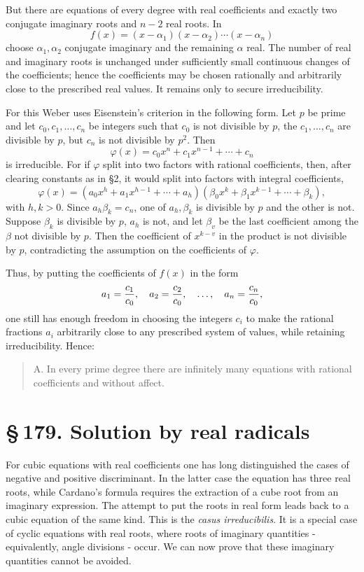 \documentclass[11pt]{article}
\providecommand{\sect}[2]{\section*{\S\,#1. #2}}
\begin{document}
But there are equations of every degree with real coefficients and exactly two conjugate imaginary roots and $n-2$ real roots. In
\[
  f(x)=(x-\alpha_1)(x-\alpha_2)\cdots(x-\alpha_n)
\]
choose $\alpha_1,\alpha_2$ conjugate imaginary and the remaining $\alpha$ real. The number of real and imaginary roots is unchanged under sufficiently small continuous changes of the coefficients; hence the coefficients may be chosen rationally and arbitrarily close to the prescribed real values. It remains only to secure irreducibility.

For this Weber uses Eisenstein's criterion in the following form. Let $p$ be prime and let $c_0,c_1,\ldots,c_n$ be integers such that $c_0$ is not divisible by $p$, the $c_1,\ldots,c_n$ are divisible by $p$, but $c_n$ is not divisible by $p^2$. Then
\[
  \varphi(x)=c_0x^n+c_1x^{n-1}+\cdots+c_n
\]
is irreducible. For if $\varphi$ split into two factors with rational coefficients, then, after clearing constants as in §2, it would split into factors with integral coefficients,
\[
\varphi(x)=(a_0x^h+a_1x^{h-1}+\cdots+a_h)
          (\beta_0x^k+\beta_1x^{k-1}+\cdots+\beta_k),
\]
with $h,k>0$. Since $a_h\beta_k=c_n$, one of $a_h,\beta_k$ is divisible by $p$ and the other is not. Suppose $\beta_k$ is divisible by $p$, $a_h$ is not, and let $\beta_v$ be the last coefficient among the $\beta$ not divisible by $p$. Then the coefficient of $x^{k-v}$ in the product is not divisible by $p$, contradicting the assumption on the coefficients of $\varphi$.

Thus, by putting the coefficients of $f(x)$ in the form
\[
  a_1={c_1\over c_0},\quad a_2={c_2\over c_0},\quad \ldots,\quad a_n={c_n\over c_0},
\]
one still has enough freedom in choosing the integers $c_i$ to make the rational fractions $a_i$ arbitrarily close to any prescribed system of values, while retaining irreducibility. Hence:
\begin{quote}
A. In every prime degree there are infinitely many equations with rational coefficients and without affect.
\end{quote}

\sect{179}{Solution by real radicals}

For cubic equations with real coefficients one has long distinguished the cases of negative and positive discriminant. In the latter case the equation has three real roots, while Cardano's formula requires the extraction of a cube root from an imaginary expression. The attempt to put the roots in real form leads back to a cubic equation of the same kind. This is the \emph{casus irreducibilis}. It is a special case of cyclic equations with real roots, where roots of imaginary quantities - equivalently, angle divisions - occur. We can now prove that these imaginary quantities cannot be avoided.
\end{document}
